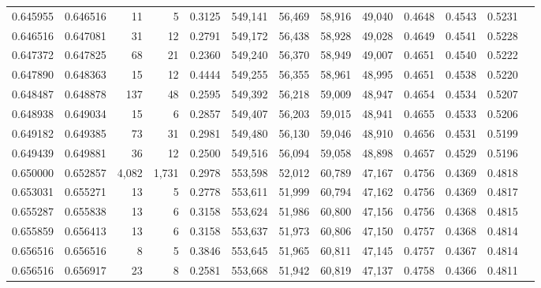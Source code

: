 \begin{tabular}{rrrrrrrrrrrrr}
0.645955 & 0.646516 &     11 &     5 &                                     0.3125 & 549,141 &  56,469 &  58,916 &  49,040 & 0.4648 & 0.4543 & 0.5231 \\
0.646516 & 0.647081 &     31 &    12 &                                     0.2791 & 549,172 &  56,438 &  58,928 &  49,028 & 0.4649 & 0.4541 & 0.5228 \\
0.647372 & 0.647825 &     68 &    21 &                                     0.2360 & 549,240 &  56,370 &  58,949 &  49,007 & 0.4651 & 0.4540 & 0.5222 \\
0.647890 & 0.648363 &     15 &    12 &                                     0.4444 & 549,255 &  56,355 &  58,961 &  48,995 & 0.4651 & 0.4538 & 0.5220 \\
0.648487 & 0.648878 &    137 &    48 &                                     0.2595 & 549,392 &  56,218 &  59,009 &  48,947 & 0.4654 & 0.4534 & 0.5207 \\
0.648938 & 0.649034 &     15 &     6 &                                     0.2857 & 549,407 &  56,203 &  59,015 &  48,941 & 0.4655 & 0.4533 & 0.5206 \\
0.649182 & 0.649385 &     73 &    31 &                                     0.2981 & 549,480 &  56,130 &  59,046 &  48,910 & 0.4656 & 0.4531 & 0.5199 \\
0.649439 & 0.649881 &     36 &    12 &                                     0.2500 & 549,516 &  56,094 &  59,058 &  48,898 & 0.4657 & 0.4529 & 0.5196 \\
0.650000 & 0.652857 &  4,082 & 1,731 &                                     0.2978 & 553,598 &  52,012 &  60,789 &  47,167 & 0.4756 & 0.4369 & 0.4818 \\
0.653031 & 0.655271 &     13 &     5 &                                     0.2778 & 553,611 &  51,999 &  60,794 &  47,162 & 0.4756 & 0.4369 & 0.4817 \\
0.655287 & 0.655838 &     13 &     6 &                                     0.3158 & 553,624 &  51,986 &  60,800 &  47,156 & 0.4756 & 0.4368 & 0.4815 \\
0.655859 & 0.656413 &     13 &     6 &                                     0.3158 & 553,637 &  51,973 &  60,806 &  47,150 & 0.4757 & 0.4368 & 0.4814 \\
0.656516 & 0.656516 &      8 &     5 &                                     0.3846 & 553,645 &  51,965 &  60,811 &  47,145 & 0.4757 & 0.4367 & 0.4814 \\
0.656516 & 0.656917 &     23 &     8 &                                     0.2581 & 553,668 &  51,942 &  60,819 &  47,137 & 0.4758 & 0.4366 & 0.4811 \\

\end{tabular}

